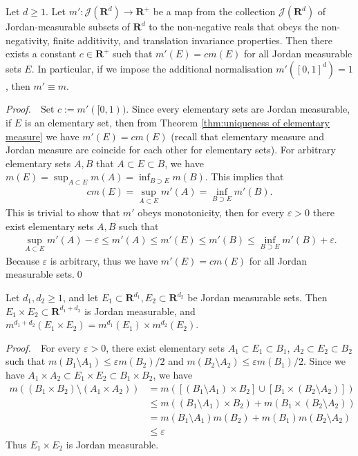 \documentclass{book}
\theoremstyle{defstyle}
\theoremstyle{thmstyle}
\newcommand{\pff}{\noindent\emph{Proof.}~~}
\begin{document}
\begin{theorem}\label{thm:uniqueness of jordan measure}
    Let $d \geq 1$. Let $m' : \mathcal{J}(\mathbf{R}^d) \to \mathbf{R}^+$ be a map from the collection $\mathcal{J}(\mathbf{R}^d)$ of Jordan-measurable subsets of $\mathbf{R}^d$ to the non-negative reals that obeys the non-negativity, finite additivity, and translation invariance properties. Then there exists a constant $c \in \mathbf{R}^+$ such that $m'(E) = cm(E)$ for all Jordan measurable sets $E$. In particular, if we impose the additional normalisation $m'([0, 1]^d) = 1$, then $m' \equiv m$.
\end{theorem}

\pff Set $c := m'([0, 1))$. Since every elementary sets are Jordan measurable, if $E$ is an elementary set, then from Theorem \ref{thm:uniqueness of elementary measure} we have $m'(E) = cm(E)$ (recall that elementary measure and Jordan measure are coincide for each other for elementary sets). For arbitrary elementary sets $A, B$ that $A \subset E \subset B$, we have $m(E) = \sup_{A \subset E}m(A) = \inf_{B \supset E}m(B)$. This implies that
    \begin{align*}
        cm(E)
        = \sup_{A \subset E} m'(A)
        = \inf_{B \supset E}m'(B).
    \end{align*}
This is trivial to show that $m'$ obeys monotonicity, then for every $\varepsilon > 0$ there exist elementary sets $A,B$ such that
    \begin{align*}
        \sup_{A \subset E}m'(A) - \varepsilon
        \leq m'(A)
        \leq m'(E)
        \leq m'(B)
        \leq \inf_{B \supset E}m'(B) + \varepsilon.
    \end{align*}
Because $\varepsilon$ is arbitrary, thus we have $m'(E) = cm(E)$ for all Jordan measurable sets.\qed


\begin{proposition}\label{thm:m(ExF)=m(E)m(F) for jordan measure}
    Let $d_1, d_2 \geq 1$, and let $E_1 \subset \mathbf{R}^{d_1}, E_2 \subset \mathbf{R}^{d_2}$ be Jordan measurable sets. Then $E_1 \times E_2 \subset \mathbf{R}^{d_1 + d_2}$ is Jordan measurable, and $m^{d_1 + d_2}(E_1 \times E_2) = m^{d_1}(E_1) \times m^{d_2}(E_2)$.
\end{proposition}

\pff For every $\varepsilon > 0$, there exist elementary sets $A_1 \subset E_1 \subset B_1$, $A_2 \subset E_2 \subset B_2$ such that $m(B_1 \setminus A_1) \leq \varepsilon m(B_2)/2$ and $m(B_2 \setminus A_2) \leq \varepsilon m(B_1)/2$. Since we have $A_1 \times A_2 \subset E_1 \times E_2 \subset B_1 \times B_2$, we have
    \begin{align*}
        m((B_1 \times B_2) \setminus (A_1 \times A_2))
        &= m([(B_1 \setminus A_1) \times B_2] \cup [B_1 \times (B_2 \setminus A_2)])\\
        &\leq m((B_1 \setminus A_1) \times B_2) + m(B_1 \times (B_2 \setminus A_2))\\
        &= m(B_1 \setminus A_1)m(B_2) + m(B_1)m(B_2 \setminus A_2)\\
        &\leq \varepsilon
    \end{align*}
Thus $E_1 \times E_2$ is Jordan measurable.
\end{document}
